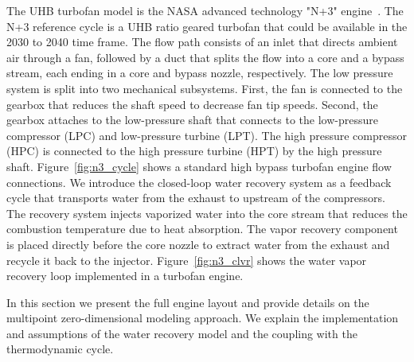 \documentclass[conf]{new-aiaa}
\begin{document}
The UHB turbofan model is the NASA advanced technology "N+3" engine~\cite{Jones2017a}.
The N+3 reference cycle is a UHB ratio geared turbofan that could be available in the 2030 to 2040 time frame.
The flow path consists of an inlet that directs ambient air through a fan, followed by a duct that splits the flow into a core and a bypass stream, each ending in a core and bypass nozzle, respectively.
The low pressure system is split into two mechanical subsystems.
First, the fan is connected to the gearbox that reduces the shaft speed to decrease fan tip speeds.
Second, the gearbox attaches to the low-pressure shaft that connects to the low-pressure compressor (LPC) and low-pressure turbine (LPT).
The high pressure compressor (HPC) is connected to the high pressure turbine (HPT) by the high pressure shaft.
Figure~\ref{fig:n3_cycle} shows a standard high bypass turbofan engine flow connections.
We introduce the closed-loop water recovery system as a feedback cycle that transports water from the exhaust to upstream of the compressors.
The recovery system injects vaporized water into the core stream that reduces the combustion temperature due to heat absorption.
The vapor recovery component is placed directly before the core nozzle to extract water from the exhaust and recycle it back to the injector.
Figure~\ref{fig:n3_clvr} shows the water vapor recovery loop implemented in a turbofan engine.

In this section we present the full engine layout and provide details on the multipoint zero-dimensional modeling approach.
We explain the implementation and assumptions of the water recovery model and the coupling with the thermodynamic cycle.
\end{document}
